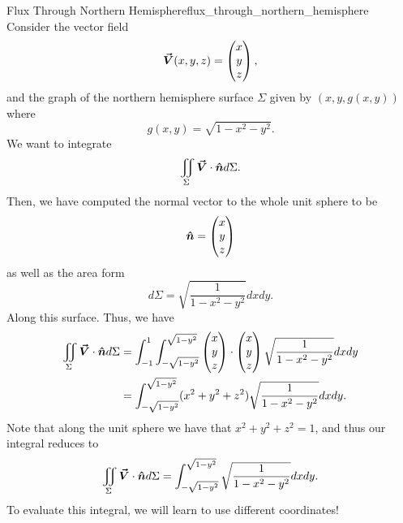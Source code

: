                                    	\begin{ex}{Flux Through Northern Hemisphere}{flux_through_northern_hemisphere}
                                   		Consider the vector field
                                   		\[
                                   		\boldsymbol{\vec{V}}(x,y,z) = \begin{pmatrix}  x\\ y \\ z \end{pmatrix},
                                   		\]
                                   		and the graph of the northern hemisphere surface $\Sigma$ given by $(x,y,g(x,y))$ where
                                   		\[
                                   		g(x,y) = \sqrt{1-x^2-y^2}.
                                   		\]
                                   		We want to integrate
                                   		\[
                                   		\iint_\Sigma \boldsymbol{\vec{V}} \cdot \boldsymbol{\hat{n}} d\Sigma.
                                   		\]
                                   		Then, we have computed the normal vector to the whole unit sphere to be
                                   		\[
                                   		\boldsymbol{\hat{n}} = \begin{pmatrix} x \\ y \\ z \end{pmatrix}
                                   		\]
                                   		as well as the area form
                                   		\[
                                   		d\Sigma = \sqrt{\frac{1}{1-x^2-y^2}}dxdy.
                                   		\]
                                   		Along this surface.  Thus, we have
                                   		\begin{align*}
                                   			\iint_\Sigma \boldsymbol{\vec{V}} \cdot \boldsymbol{\hat{n}} d\Sigma &= \int_{-1}^1 \int_{-\sqrt{1-y^2}}^{\sqrt{1-y^2}} \begin{pmatrix} x \\ y \\ z \end{pmatrix} \cdot \begin{pmatrix} x \\ y \\ z \end{pmatrix} \sqrt{\frac{1}{1-x^2-y^2}}dxdy\\
                                   			&= \int_{-\sqrt{1-y^2}}^{\sqrt{1-y^2}} (x^2+y^2+z^2) \sqrt{\frac{1}{1-x^2-y^2}}dxdy.
                                   		\end{align*}
                                   		Note that along the unit sphere we have that $x^2+y^2+z^2=1$, and thus our integral reduces to
                                   		\[
                                   		\iint_\Sigma \boldsymbol{\vec{V}} \cdot \boldsymbol{\hat{n}} d\Sigma =  \int_{-\sqrt{1-y^2}}^{\sqrt{1-y^2}} \sqrt{\frac{1}{1-x^2-y^2}}dxdy.
                                   		\]
                                   		To evaluate this integral, we will learn to use different coordinates!
                                   	\end{ex}

